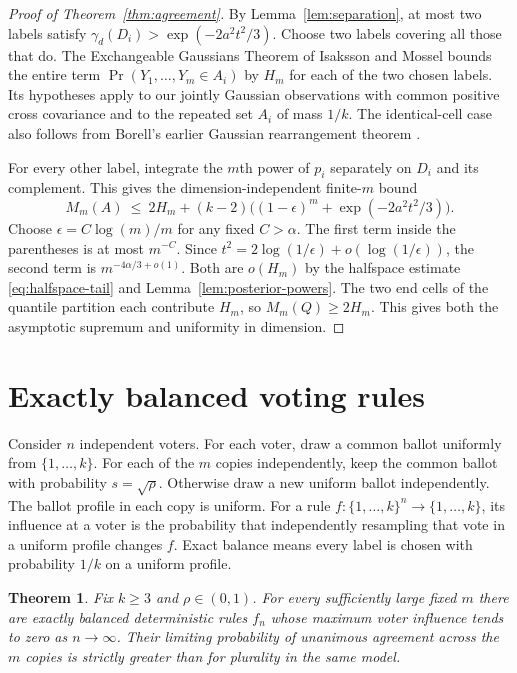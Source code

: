 \documentclass[11pt,reqno]{amsart}
\newtheorem{theorem}{Theorem}
\newcommand{\ga}{\gamma}
\begin{document}
\begin{proof}[Proof of Theorem~\ref{thm:agreement}]
By Lemma~\ref{lem:separation}, at most two labels satisfy
$\ga_d(D_i)>\exp(-2a^2t^2/3)$. Choose two labels covering all
those that do. The Exchangeable Gaussians Theorem of Isaksson and
Mossel \cite[Theorem~1.2]{IM} bounds the entire term
$\Pr(Y_1,\ldots,Y_m\in A_i)$ by $H_m$ for each of the two chosen
labels. Its hypotheses apply to our jointly Gaussian observations
with common positive cross covariance and to the repeated set $A_i$
of mass $1/k$. The identical-cell case also follows from
Borell's earlier Gaussian rearrangement theorem
\cite[Theorem~3.1]{Borell}.

For every other label, integrate the $m$th power of $p_i$ separately
on $D_i$ and its complement. This gives the dimension-independent
finite-$m$ bound
\begin{equation}\label{eq:upper}
 M_m(A)\ \le\
 2H_m+(k-2)\big((1-\epsilon)^m+\exp(-2a^2t^2/3)\big).
\end{equation}
Choose $\epsilon=C\log(m)/m$ for any fixed $C>\alpha$. The first
term inside the parentheses is at most $m^{-C}$. Since
$t^2=2\log(1/\epsilon)+o(\log(1/\epsilon))$, the second term is
$m^{-4\alpha/3+o(1)}$. Both are $o(H_m)$ by the halfspace
estimate \eqref{eq:halfspace-tail} and Lemma~\ref{lem:posterior-powers}. The two end cells of the quantile partition
each contribute $H_m$, so $M_m(Q)\ge2H_m$. This gives both the
asymptotic supremum and uniformity in dimension.
\end{proof}

\section{Exactly balanced voting rules}

Consider $n$ independent voters. For each voter, draw a common ballot
uniformly from $\{1,\ldots,k\}$. For each of the $m$ copies
independently, keep the common ballot with probability $s=\sqrt\rho$.
Otherwise draw a new uniform ballot independently. The ballot profile
in each copy is uniform. For a rule
$f:\{1,\ldots,k\}^n\to\{1,\ldots,k\}$, its influence at a voter is
the probability that independently resampling that vote in a uniform
profile changes $f$. Exact balance means every label is chosen with
probability $1/k$ on a uniform profile.

\begin{theorem}\label{thm:voting}
Fix $k\ge3$ and $\rho\in(0,1)$. For every sufficiently large fixed
$m$ there are exactly balanced deterministic rules $f_n$ whose maximum
voter influence tends to zero as $n\to\infty$. Their limiting
probability of unanimous agreement across the $m$ copies is strictly
greater than for plurality in the same model.
\end{theorem}
\end{document}
